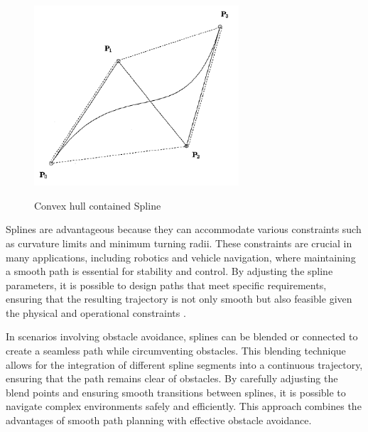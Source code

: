 \begin{figure}[H]
    \begin{center}
        \includegraphics[width=3in]{images/Chap1/convex-hull.png}\\
        \caption{Convex hull contained Spline \cite{R29}}
        \label{convex-hull}
    \end{center}
\end{figure}

Splines are advantageous because they can accommodate various constraints such as curvature limits 
and minimum turning radii. These constraints are crucial in many applications, including robotics 
and vehicle navigation, where maintaining a smooth path is essential for stability and control. 
By adjusting the spline parameters, it is possible to design paths that meet specific requirements, 
ensuring that the resulting trajectory is not only smooth but also feasible given the physical and 
operational constraints \cite{R30}.

In scenarios involving obstacle avoidance, splines can be blended or connected to create a seamless 
path while circumventing obstacles. This blending technique allows for the integration of different 
spline segments into a continuous trajectory, ensuring that the path remains clear of obstacles. 
By carefully adjusting the blend points and ensuring smooth transitions between splines, it is 
possible to navigate complex environments safely and efficiently. This approach combines the 
advantages of smooth path planning with effective obstacle avoidance.



